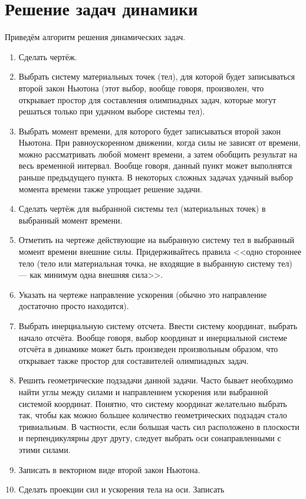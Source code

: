 \section{Решение задач динамики}
Приведём алгоритм решения динамических задач.
\begin{enumerate}
\item Сделать чертёж.
\item Выбрать систему материальных точек (тел), для которой будет записываться второй  закон Ньютона
(этот выбор, вообще говоря, произволен, что открывает простор для составления олимпиадных задач,
которые могут решаться только при удачном выборе системы тел).
\item Выбрать момент времени, для которого будет записываться второй закон Ньютона.
При равноускоренном движении, когда силы не зависят от времени, можно рассматривать любой
момент времени, а затем обобщить результат на весь временной интервал. Вообще говоря, данный пункт
может выполнятся раньше предыдущего пункта. В некоторых сложных задачах
удачный выбор момента времени также упрощает решение задачи.
\item Сделать чертёж для выбранной системы тел (материальных точек) в выбранный момент времени.
\item Отметить на чертеже действующие на выбранную систему тел в выбранный момент времени
внешние силы. Придерживайтесь правила <<одно стороннее тело (тело или материальная точка, не входящие в
выбранную систему тел) --- как минимум одна внешняя сила>>.
\item Указать на чертеже направление ускорения (обычно это направление достаточно просто находится).
\item Выбрать инерциальную систему отсчета.
Ввести систему координат, выбрать начало отсчёта. Вообще говоря, выбор координат и инерциальной
системе отсчёта в динамике может быть
произведен произвольным образом, что открывает также простор для составителей олимпиадных задач.
\item Решить геометрические подзадачи данной задачи. Часто бывает необходимо найти углы между силами
и направлением ускорения или выбранной системой координат. Понятно, что систему координат
желательно выбрать так, чтобы как можно большее количество геометрических подзадач стало тривиальным.
В частности, если большая часть сил расположено в плоскости и перпендикулярны друг другу, следует
выбрать оси сонаправленными с этими силами.
\item Записать в векторном виде второй закон Ньютона.
\item Сделать проекции сил и ускорения тела на оси. Записать

\end{enumerate}
